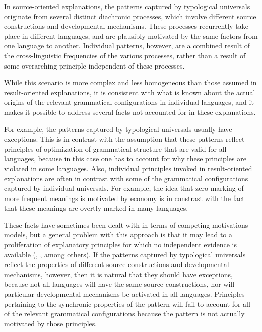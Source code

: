 \documentclass[output=paper]{langsci/langscibook}
\begin{document}
In 
\label{p:cristofaro:strands}
source-oriented explanations,  the patterns
captured by typological universals originate from several distinct diachronic processes, which involve
different source constructions and developmental mechanisms. 
These
processes recurrently take place in different languages, and are
plausibly motivated by the same factors from one language to another. Individual patterns, however, are a combined
result of the cross-linguistic frequencies of the various processes, rather than a result
of some 
overarching principle independent of these processes.

While
this scenario is 
more complex and less homogeneous than those assumed in result-oriented explanations, it is consistent with what is known about the actual origins of
the relevant grammatical configurations in individual languages, and it
makes it possible to address several facts  not accounted for in
these explanations. 

For example, the patterns captured by typological universals usually
have exceptions. This is
in contrast with the assumption that these patterns reflect principles of optimization of
grammatical structure that are valid for all languages, because in
this case one has to account for why these principles are violated in
some languages. Also, individual principles invoked in result-oriented
explanations are often in contrast with some of the
grammatical configurations captured by individual universals. For
example, the idea that zero marking of more frequent meanings is
motivated by economy is in constrast with the fact that these meanings
are overtly marked in many languages. 

These facts have sometimes been
dealt with in terms of competing motivations models, but a general
problem with this approach is that it may lead to a
proliferation of explanatory principles for which no independent
evidence is available (, \citealt{Otacompetingmotivations}, among
others). If the patterns captured by typological universals reflect the properties of different
source constructions and developmental mechanisms, however,  then 
\label{p:cristofaro:commonalitiesexceptions}
it is
natural that they should have exceptions, because not all
languages will have the same source constructions, nor will
particular developmental mechanisms be activated in all
languages. Principles pertaining to the synchronic properties of the
pattern will fail to account for all of the relevant grammatical
configurations because the pattern is not actually motivated by those principles.
\end{document}

